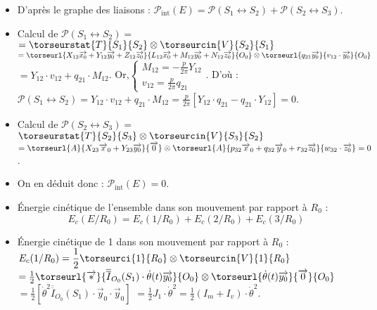 \begin{multicols}{2}
\ifprof\begin{corrige}
\begin{itemize}
\item D'après le graphe des liaisons : $
\mathcal{P}_{\text{int}}(E)=\mathcal{P}(S_1 \leftrightarrow S_2)+\mathcal{P}(S_2 \leftrightarrow S_3)$.
\item Calcul de $\mathcal{P}(S_1 \leftrightarrow S_2)=$
$=\torseurstat{T}{S_1}{S_2}\otimes \torseurcin{V}{S_2}{S_1}$
$=\torseurl{X_{12}\overrightarrow{x_0}+Y_{12}\overrightarrow{y_0}+Z_{12}\overrightarrow{z_0}}{L_{12}\overrightarrow{x_0}+M_{12}\overrightarrow{y_0}+N_{12}\overrightarrow{z_0}}{O_0}
\otimes
\torseurl{q_{21}\overrightarrow{y_0}}{v_{12}\cdot \overrightarrow{y_0}}{O_0}$
$=Y_{12}\cdot v_{12}+q_{21}\cdot M_{12}$.
Or,$
\left\{
\begin{array}{c}
M_{12}=-\frac{p}{2\pi}Y_{12}\\
v_{12}=\frac{p}{2\pi}q_{21}
\end{array}
\right.
$. 
D'où : 
$
\mathcal{P}(S_1 \leftrightarrow S_2)
=Y_{12}\cdot v_{12}+q_{21}\cdot M_{12}=\frac{p}{2\pi}\left[Y_{12}\cdot q_{21}-q_{21}\cdot Y_{12}\right]=0
$.

\item Calcul de $\mathcal{P}(S_2 \leftrightarrow S_3)=$
$
\torseurstat{T}{S_2}{S_3}\otimes \torseurcin{V}{S_3}{S_2}$
$=\torseurl{A}{X_{23}\overrightarrow{x}_0+Y_{23}\overrightarrow{y_0}}{\overrightarrow{0}}
\otimes
\torseurl{A}{p_{32}\overrightarrow{x}_0+q_{32}\overrightarrow{y}_0+r_{32}\overrightarrow{z_0}}{w_{32}\cdot \overrightarrow{z_0}}\\
=0$.

\item On en déduit donc : 
$
\mathcal{P}_{\text{int}}(E)=0$.
\end{itemize}

\end{corrige}\else\fi



\ifprof\begin{corrige}
\begin{itemize}
\item Énergie cinétique de l'ensemble dans son mouvement par rapport à $R_0$ : 
$$
E_c(E/R_0)=E_c(1/R_0)+E_c(2/R_0)+E_c(3/R_0)
$$

\item Énergie cinétique de 1 dans son mouvement par rapport à $R_0$ :
$E_c(1/R_0)
=\dfrac{1}{2}
\torseurci{1}{R_0}
\otimes \torseurcin{V}{1}{R_0}$
$=\frac{1}{2}\torseurl{\overrightarrow{*}}{\overline{\overline{I}}_{O_0}(S_1)\cdot \dot{\theta}(t)\overrightarrow{y_0}}{O_0}\otimes
 \torseurl{\dot{\theta}(t)\overrightarrow{y_0}}{\overrightarrow{0}}{O_0}$
$=\frac{1}{2}\left[\dot{\theta}^2\overline{\overline{I}}_{O_0}(S_1)\cdot \overrightarrow{y}_0\cdot \overrightarrow{y}_0\right]$
$=\frac{1}{2}J_1\cdot \dot{\theta}^2=\frac{1}{2}\left(I_m+I_v\right)\cdot \dot{\theta}^2$.


\end{itemize}
\end{corrige}
\end{multicols}
